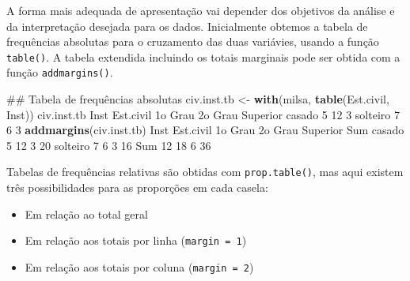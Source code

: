 \documentclass[10pt,a4paper]{book}
\newenvironment{Shaded}{\begin{snugshade}}{\end{snugshade}}
\newcommand{\KeywordTok}[1]{\textcolor[rgb]{0.13,0.29,0.53}{\textbf{#1}}}
\newcommand{\DecValTok}[1]{\textcolor[rgb]{0.00,0.00,0.81}{#1}}
\newcommand{\StringTok}[1]{\textcolor[rgb]{0.31,0.60,0.02}{#1}}
\newcommand{\NormalTok}[1]{#1}
\providecommand{\tightlist}{%
  \setlength{\itemsep}{0pt}\setlength{\parskip}{0pt}}
\begin{document}
A forma mais adequada de apresentação vai depender dos objetivos da
análise e da interpretação desejada para os dados. Inicialmente obtemos
a tabela de frequências absolutas para o cruzamento das duas variávies,
usando a função \texttt{table()}. A tabela extendida incluindo os totais
marginais pode ser obtida com a função \texttt{addmargins()}.

\begin{Shaded}
\begin{Highlighting}[]
\NormalTok{## Tabela de frequências absolutas}
\NormalTok{civ.inst.tb <-}\StringTok{ }\KeywordTok{with}\NormalTok{(milsa, }\KeywordTok{table}\NormalTok{(Est.civil, Inst))}
\NormalTok{civ.inst.tb}
\NormalTok{          Inst}
\NormalTok{Est.civil  1o Grau 2o Grau Superior}
\NormalTok{  casado         }\DecValTok{5}      \DecValTok{12}        \DecValTok{3}
\NormalTok{  solteiro       }\DecValTok{7}       \DecValTok{6}        \DecValTok{3}
\KeywordTok{addmargins}\NormalTok{(civ.inst.tb)}
\NormalTok{          Inst}
\NormalTok{Est.civil  1o Grau 2o Grau Superior Sum}
\NormalTok{  casado         }\DecValTok{5}      \DecValTok{12}        \DecValTok{3}  \DecValTok{20}
\NormalTok{  solteiro       }\DecValTok{7}       \DecValTok{6}        \DecValTok{3}  \DecValTok{16}
\NormalTok{  Sum           }\DecValTok{12}      \DecValTok{18}        \DecValTok{6}  \DecValTok{36}
\end{Highlighting}
\end{Shaded}

Tabelas de frequências relativas são obtidas com \texttt{prop.table()},
mas aqui existem três possibilidades para as proporções em cada casela:

\begin{itemize}
\tightlist
\item
  Em relação ao total geral
\item
  Em relação aos totais por linha (\texttt{margin\ =\ 1})
\item
  Em relação aos totais por coluna (\texttt{margin\ =\ 2})
\end{itemize}
\end{document}
